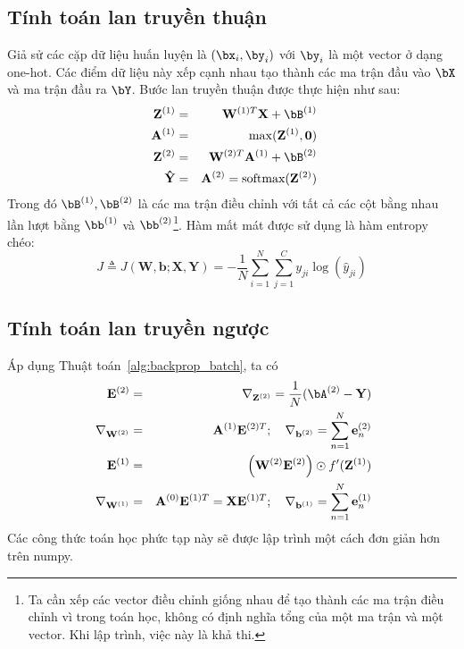 \subsection{Tính toán lan truyền thuận}
Giả sử các cặp dữ liệu huấn luyện là $(\bx_i, \by_i)$ với $\by_i$ là một vector
ở dạng one-hot. Các điểm dữ liệu này xếp cạnh nhau tạo thành các ma trận đầu
vào $\bX$ và ma trận đầu ra $\bY$. Bước lan truyền thuận được
thực hiện như sau:
\begin{eqnarray} 
\mathbf{Z}^{(1)} &=& \mathbf{W}^{(1)T}\mathbf{X} + \bB^{(1)}\\\ 
\mathbf{A}^{(1)} &=& \max(\mathbf{Z}^{(1)}, \mathbf{0}) \\\ 
\mathbf{Z}^{(2)} &=& \mathbf{W}^{(2)T}\mathbf{A}^{(1)} + \bB^{(2)}\\\ 
\mathbf{\hat{Y}} &=& \mathbf{A}^{(2)} = \text{softmax}(\mathbf{Z}^{(2)}) 
\end{eqnarray} 
Trong đó $\bB^{(1)}, \bB^{(2)}$ là các ma trận điều chỉnh với tất cả các cột bằng nhau
lần lượt bằng $\bb^{(1)}$ và $\bb^{(2)}$\footnote{Ta cần xếp các vector điều chỉnh
giống nhau để tạo thành các ma trận điều chỉnh vì trong toán học, không có định nghĩa
tổng của một ma trận và một vector. Khi lập trình, việc này là khả thi.}.
Hàm mất mát được sử dụng là hàm entropy chéo:
\begin{equation} 
J \triangleq J(\mathbf{W, b}; \mathbf{X, Y}) = -\frac{1}{N}\sum_{i = 1}^N \sum_{j = 1}^C y_{ji}\log(\hat{y}_{ji}) 
\end{equation} 
 
 
\subsection{Tính toán lan truyền ngược}
Áp dụng Thuật toán~\ref{alg:backprop_batch}, ta có 
\begin{eqnarray} 
\mathbf{E}^{(2)} &=& \nabla_{\mathbf{Z}^{(2)}}
=\frac{1}{N}(\bA^{(2)}- \mathbf{Y}) \\\ 
\nabla_{\mathbf{W}^{(2)}} &=& \mathbf{A}^{(1)} 
\mathbf{E}^{(2)T}; \quad 
\nabla_{\mathbf{b}^{(2)}} = \sum_{n=1}^N\mathbf{e}_n^{(2)}
\\\ 
\mathbf{E}^{(1)} &=& \left(\mathbf{W}^{(2)}\mathbf{E}^{(2)}\right) \odot
f'(\mathbf{Z}^{(1)}) \\\
\nabla_{\mathbf{W}^{(1)}} &=& \mathbf{A}^{(0)} 
\mathbf{E}^{(1)T} = \mathbf{X}\mathbf{E}^{(1)T};\quad 
\nabla_{\mathbf{b}^{(1)}} = \sum_{n=1}^N\mathbf{e}_n^{(1)}
\end{eqnarray} 
Các công thức toán học phức tạp này sẽ được lập trình một cách đơn giản
hơn trên numpy. 
 
